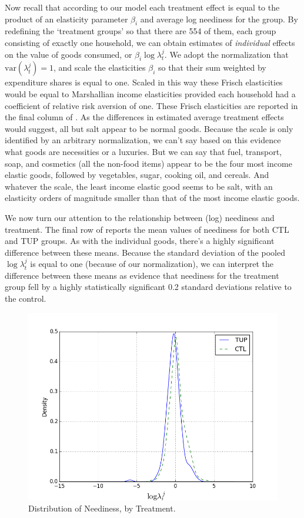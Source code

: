 \documentclass[11pt]{article}
\begin{document}
Now recall that according to our model each treatment effect is equal
to the product of an elasticity parameter $\beta_i$ and average log
neediness for the group.  By redefining the `treatment groups' so that
there are 554 of them, each group consisting of exactly one household,
we can obtain estimates of \emph{individual} effects on the value of goods
consumed, or $\beta_i\log\lambda^j_t$.  We adopt the normalization
that $\mbox{var}(\lambda^j_t)=1$, and scale the elasticities $\beta_i$
so that their sum weighted by expenditure shares is equal to one.
Scaled in this way these Frisch elasticities would be equal to
Marshallian income elasticities provided each household had a
coefficient of relative risk aversion of one.  These Frisch
elasticities are reported in the final column of .
As the differences in estimated average treatment effects would
suggest, all but salt appear to be normal goods.  Because the scale is
only identified by an arbitrary normalization, we can't say based on
this evidence what goods are necessities or a luxuries.  But we can
say that fuel, transport, soap, and cosmetics (all the non-food items)
appear to be the four most income elastic goods, followed by
vegetables, sugar, cooking oil, and cereals.  And whatever the scale,
the least income elastic good seems to be salt, with an elasticity
orders of magnitude smaller than that of the most income elastic goods.

We now turn our attention to the relationship between (log) neediness
and treatment.  The final row of  reports the mean
values of neediness for both CTL and TUP groups.  As with the
individual goods, there's a highly significant difference between
these means.  Because the standard deviation of the pooled
$\log\lambda^j_t$ is equal to one (because of our normalization), we
can interpret the difference between these means as evidence that
neediness for the treatment group fell by a highly statistically
significant 0.2 standard deviations relative to the control.

\begin{figure}[htb]
\centering
\includegraphics[width=.9\linewidth]{../analysis/figures/loglambda_distribution_by_treatment.png}
\caption{\label{fig:loglambda_distribution_by_treatment}Distribution of Neediness, by Treatment.}
\end{figure}
\end{document}
